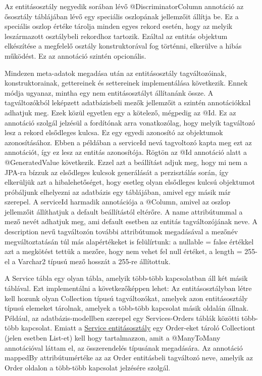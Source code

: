 \documentclass[centeredchapter]{thesis-ekf}
\theoremstyle{definition}
\theoremstyle{remark}
\begin{document}
Az entitásosztály negyedik sorában lévő @DiscriminatorColumn annotáció az ősosztály táblájában lévő egy speciális oszlopának jellemzőit állítja be. Ez a speciális oszlop értéke tárolja minden egyes rekord esetén, hogy az melyik leszármazott osztálybeli rekordhoz tartozik. Ezáltal az entitás objektum elkészítése a megfelelő osztály konstruktorával fog történni, elkerülve a hibás működést.
Ez az annotáció szintén opcionális.

Mindezen meta-adatok megadása után az entitásosztály tagváltozóinak, konstruktorainak,  gettereinek és settereinek implementálása következik. Ennek módja ugyanaz, mintha egy nem entitásosztályt állítanánk össze. A tagváltozókból leképzett adatbázisbeli mezők jellemzőit a szintén annotációkkal adhatjuk meg. Ezek közül egyetlen egy a kötelező, mégpedig az @Id. Ez az annotáció szolgál jelzésül a fordítónak arra vonatkozólag, hogy melyik tagváltozó lesz a rekord elsődleges kulcsa. Ez egy egyedi azonosító az objektumok azonosításához. Ebben a példában a serviceId nevá tagvoltozó kapta meg ezt az annotációt, így ez lesz az entitás azonosítója. Rögtön az @Id annotáció alatt a @GeneratedValue következik. Ezzel azt a beállítást adjuk meg, hogy mi nem a JPA-ra bízzuk az elsődleges kulcsok generálását a perzisztálás során, így elkerüljük azt a hibalehetőséget, hogy esetleg olyan elsődleges kulcsú objektumot próbáljunk elhelyezni az adatbázis egy táblájában, amivel egy másik már szerepel. A serviceId harmadik annotációja a @Column, amivel az oszlop jellemzőit állíthatjuk a default beállítástól eltérőre. A name attribútummal a mező nevét adhatjuk meg, ami default esetben az entitás tagváltozójának neve. A description nevű tagváltozón további attribútumok megadásával a mezőnév megváltoztatásán túl más alapértékeket is felülírtunk: a nullable = false értékkel azt a megkötést tettük a mezőre, hogy nem vehet fel null értéket, a length = 255-el a Varchar2 típusú mező hosszát a 255-re állítottuk. 

A Service tábla egy olyan tábla, amelyik több-több kapcsolatban áll két másik táblával. Ezt implementálni a következőképpen lehet: Az entitásosztályban létre kell hozunk olyan Collection típusú tagváltozókat, amelyek azon entitásosztály típusú elemeket tárolnak, amelyek a több-több kapcsolat másik oldalán állnak. Például, az adatbázis-modellben szerepel egy Services-Orders táblák közötti több-több kapcsolat. Emiatt a \hyperlink{figure-order-entity}{Service entitásosztály} egy Order-eket tároló Collectiont (jelen esetben List-et) kell hogy tartalmazzon, amit a @ManyToMany annotációval láttam el, az összerendelés típusának megadására. Az annotáció mappedBy attribútumértéke az az Order entitásbeli tagváltozó neve, amelyik az Order oldalon a több-több kapcsolat jelzésére szolgál.
\end{document}
